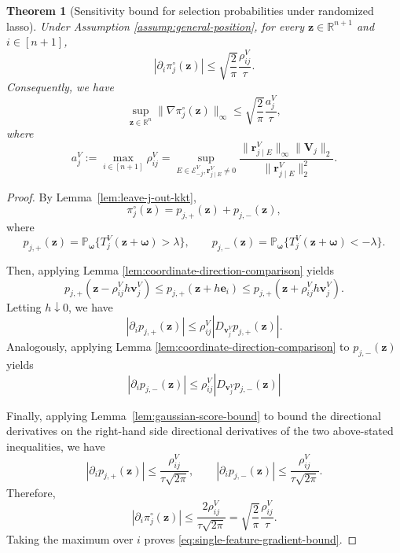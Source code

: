 \documentclass[12pt]{article}
\newtheorem{theorem}{Theorem}
\theoremstyle{definition}
\begin{document}
\begin{theorem}[Sensitivity bound for selection probabilities under randomized lasso]
\label{thm:single-feature-stability}
Under Assumption {\ref{assump:general-position}}, for every $\boldsymbol z\in\mathbb R^{n+1}$ and
$i\in[n+1]$,
\begin{equation}
    |\partial_i\pi_j^{\circ}(\boldsymbol z)|
    \le
    \sqrt{\frac{2}{\pi}}\frac{\rho_{ij}^V}{\tau}.
    \label{eq:single-feature-coordinate-bound}
\end{equation}
Consequently, we have 
\begin{equation}
    \sup_{\boldsymbol z\in\mathbb R^n}
    \|\nabla\pi_j^{\circ}(\boldsymbol z)\|_\infty
    \le
    \sqrt{\frac{2}{\pi}}\frac{a_j^V}{\tau},
    \label{eq:single-feature-gradient-bound}
\end{equation}
where 
\[a_j^V
    :=
    \max_{i\in[n+1]}\rho_{ij}^V
    =
    \sup_{{E\in\mathcal E_{-j}^V,\boldsymbol r_{j\mid E}^V\ne0}}
    \frac{\|\boldsymbol r_{j\mid E}^V\|_\infty\|\boldsymbol V_j\|_2}
         {\|\boldsymbol r_{j\mid E}^V\|_2^2}.
\]
\end{theorem}

\begin{proof}
By Lemma~\ref{lem:leave-j-out-kkt}, 
\[
    \pi_j^{\circ}(\boldsymbol z)
    =
    p_{j,+}(\boldsymbol z)+p_{j,-}(\boldsymbol z),
\]
where
\[
    p_{j,+}(\boldsymbol z)
    =
    \mathbb P_{\boldsymbol\omega}\{T_j^V(\boldsymbol z+\boldsymbol\omega)>\lambda\},
    \qquad
    p_{j,-}(\boldsymbol z)
    =
    \mathbb P_{\boldsymbol\omega}\{T_j^V(\boldsymbol z+\boldsymbol\omega)<-\lambda\}.
\]

Then, applying Lemma \ref{lem:coordinate-direction-comparison} yields
\[
    p_{j,+}(\boldsymbol z-\rho_{ij}^V h\boldsymbol v_j^V)
    \le
    p_{j,+}(\boldsymbol z+h\boldsymbol e_i)
    \le
    p_{j,+}(\boldsymbol z+\rho_{ij}^V h\boldsymbol v_j^V).
\]
Letting $h\downarrow0$, we have
\[
    |\partial_i p_{j,+}(\boldsymbol z)|
    \le
    \rho_{ij}^V|D_{\boldsymbol v_j^V}p_{j,+}(\boldsymbol z)|.
\]
Analogously, applying Lemma \ref{lem:coordinate-direction-comparison} to $p_{j,-}(\boldsymbol z)$ yields
\[
|\partial_i p_{j,-}(\boldsymbol z)|
    \le
    \rho_{ij}^V|D_{\boldsymbol v_j^V}p_{j,-}(\boldsymbol z)|
\]

Finally, applying Lemma~\ref{lem:gaussian-score-bound} to bound the directional derivatives on the right-hand side directional derivatives of the two above-stated inequalities, we have
\[
    |\partial_i p_{j,+}(\boldsymbol z)|
    \le
    \frac{\rho_{ij}^V}{\tau\sqrt{2\pi}},
    \qquad
    |\partial_i p_{j,-}(\boldsymbol z)|
    \le
    \frac{\rho_{ij}^V}{\tau\sqrt{2\pi}}.
\]
Therefore,
\[
    |\partial_i\pi_j^{\circ}(\boldsymbol z)|
    \le
    \frac{2\rho_{ij}^V}{\tau\sqrt{2\pi}}
    =
    \sqrt{\frac{2}{\pi}}\frac{\rho_{ij}^V}{\tau}.
\]
Taking the maximum over $i$ proves
\eqref{eq:single-feature-gradient-bound}.
\end{proof}
\end{document}
